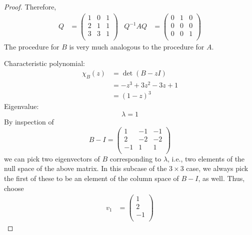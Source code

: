 \documentclass[../psets.tex]{subfiles}
\begin{document}
\begin{enumerate}
\begin{proof}
        Therefore,
        \begin{align*}
            Q &=
            \begin{pmatrix}
                1 & 0 & 1\\
                2 & 1 & 1\\
                3 & 3 & 1\\
            \end{pmatrix}&
            Q^{-1}AQ &=
            \begin{pmatrix}
                0 & 1 & 0\\
                0 & 0 & 0\\
                0 & 0 & 1\\
            \end{pmatrix}
        \end{align*}
        The procedure for $B$ is very much analogous to the procedure for $A$.\par
        Characteristic polynomial:
        \begin{align*}
            \chi_B(z) &= \det(B-zI)\\
            &= -z^3+3z^2-3z+1\\
            &= (1-z)^3
        \end{align*}
        Eigenvalue:
        \begin{equation*}
            \lambda = 1
        \end{equation*}
        By inspection of
        \begin{equation*}
            B-I =
            \begin{pmatrix}
                1 & -1 & -1\\
                2 & -2 & -2\\
                -1 & 1 & 1\\
            \end{pmatrix}
        \end{equation*}
        we can pick two eigenvectors of $B$ corresponding to $\lambda$, i.e., two elements of the null space of the above matrix. In this subcase of the $3\times 3$ case, we always pick the first of these to be an element of the column space of $B-I$, as well. Thus, choose
        \begin{align*}
            v_1 &=
            \begin{pmatrix}
                1\\
                2\\
                -1\\

\end{pmatrix}
\end{align*}
\end{proof}
\end{enumerate}
\end{document}
